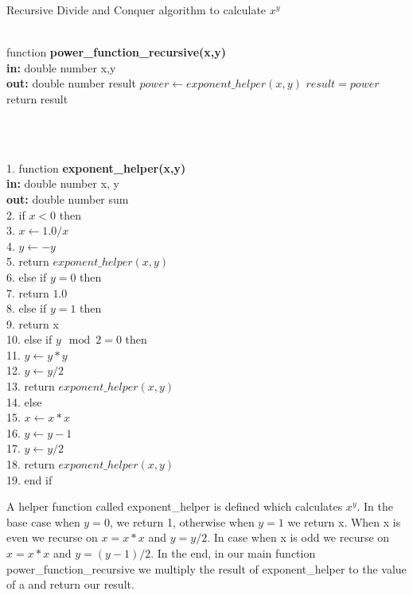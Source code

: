 \documentclass{article}
\begin{document}
\begin{algorithm}
\caption{Recursive Divide and Conquer algorithm to calculate $x^y$}
\begin{algorithmic} 
\\function \textbf{power\_function\_recursive(x,y)}\\
\textbf{in: } double number x,y\\
\textbf{out: } double number result
    \State $power \leftarrow exponent\_helper(x,y)$
    \State $result = power$\\
 return result
\end{algorithmic}
\end{algorithm}
\\
\begin{algorithm}
\begin{algorithmic}
\\1. function \textbf{exponent\_helper(x,y)}\\
\textbf{in: } double number x, y\\
\textbf{out: } double number sum\\
2. if  \State $x < 0$  then\\
3. \qquad $x \leftarrow 1.0 / x$ \\
4. \qquad $y \leftarrow -y$ \\
5. \qquad return $exponent\_helper(x,y)$ \\
6. else if \State $y = 0$ then \\
7.    \qquad return $1.0$ \\
8. else if  \StateE $y = 1$ then \\
9.    \qquad return x \\
10. else if  \State $y \mod  2 = 0$ then \\
11.    \qquad $y \leftarrow y * y$ \\
12.    \qquad $y \leftarrow y / 2$ \\
13.    \qquad return $exponent\_helper(x, y)$\\
14. else \\
15.    \qquad $x \leftarrow x * x$ \\
16.    \qquad $y \leftarrow y - 1$ \\
17.    \qquad $y \leftarrow y / 2$ \\
18.    \qquad return $exponent\_helper(x, y)$\\
19. end if \\
\end{algorithmic}
\end{algorithm}
A helper function called exponent\_helper is defined which calculates $x^y$. In the base case when $y = 0$, we return 1, otherwise when $y = 1$ we return x. When x is even we recurse on $x = x* x$ and $y = y /2$. In case when x is odd we recurse on $x = x* x$ and $y = (y-1)/ 2$. In the end, in our main function power\_function\_recursive we multiply the result of exponent\_helper to the value of a and return our result.
\end{document}
